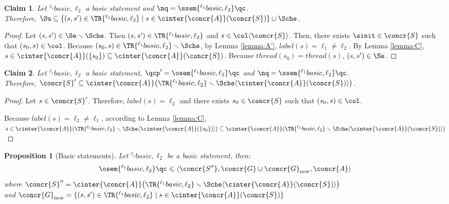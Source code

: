 \documentclass[12pt]{article}
\let\firstunion\cup
\let\cup\firstunion
\renewcommand{\subset}{\subseteq}
\let\n\newcommand
\newcommand{\li}[1]{ {}^{\ell_{#1}}  }
\newcommand{\lbl}{\mathit{label}}
\newcommand{\thread}{\mathit{thread}}
\newtheorem{proposition}{Proposition}
\newtheorem{claim}{Claim}
\begin{document}
\begin{claim}\label{claim:SeV}
 Let \(\li1 basic,\ell_2\) a basic statement and \(\nq=\ssem{\li1 basic,\ell_2}\qc\).\\
 Therefore, \(\Su\subset \{(s,s')\in\TR{\li1 basic,\ell_2}\mid s\in \cinter{\concr{A}}(\concr{S}) \}\cup\Sche\).
 \end{claim}
\begin{proof}
Let \((s,s')\in \Se\smallsetminus\Sche\).
Then \((s,s')\in \TR{\li1 basic,\ell_2} \) and \(s\in\col\langle\concr{S} \rangle \).
Then, there exists \(\sinit\in\concr{S}\) such that \((s_0,s)\in\col\).
Because \((s_0,s)\in \TR{\li1 basic,\ell_2}\smallsetminus\Sche \), by Lemma \ref{lemma:A'}, \(\lbl(s)=\ell_1\neq\ell_2\).
 By Lemma \ref{lemma:C}, \(s \in \cinter{\concr{A}}(\{s_0\}) \subset \cinter{\concr{A}}(\concr{S})\). 
 Because \(\thread(s_0)=\thread(s)\), \((s,s')\in \Se\).
\end{proof}

\begin{claim}
 \label{claim:BS}
 Let \(\li1 basic,\ell_2\) a basic statement, \(\qcp'=\osem{\li1 basic,\ell_2}\qc\) and \(\nq=\ssem{\li1 basic,\ell_2}\qc\).\\
 Therefore, \(\concr{S}'\subset\cinter{\concr{A}} \big(\TR{\li1 basic,\ell_2}\smallsetminus \Sche \langle  \cinter{\concr{A}}(\concr{S})\rangle\big)\).
\end{claim}
\begin{proof}
Let \(s\in\concr{S}'\). Therefore, \(\lbl(s)=\ell_2\) and there exists \(s_0\in\concr{S}\) such that \((s_0,s)\in\col\).

Because \(\lbl(s)=\ell_2\neq\ell_1\), according to Lemma \ref{lemma:C}, \(s \in\cinter{\concr{A}}(\TR{\li1 basic,\ell_2} \smallsetminus\Sche \langle \cinter{\concr{A}}(\{s_0\}) \rangle) \subset\cinter{\concr{A}}(\TR{\li1 basic,\ell_2} \smallsetminus\Sche \langle \cinter{\concr{A}}(\concr{S}) \rangle) \)
\end{proof}



\n{\Gnew}{\concr{G}_{\text{new}}}

\begin{proposition}[Basic statements]\label{prop:basic}
 Let \(\li1 basic,\ell_2\) be a basic statement, then:
  \[\osem{\li1 basic,\ell_2}\qc \leqslant \langle \concr{S''}, \concr{G}\cup\Gnew ,\concr{A} \rangle\]
 where \(\concr{S}'' = \cinter{\concr{A}} \big(\TR{\li1 basic,\ell_2}\smallsetminus \Sche \langle  \cinter{\concr{A}}(\concr{S})\rangle\big)\)
\\ and \(\Gnew = \{(s,s')\in\TR{\li1 basic,\ell_2}\mid s\in \cinter{\concr{A}}(\concr{S})  \} \)
\end{proposition}
\end{document}
